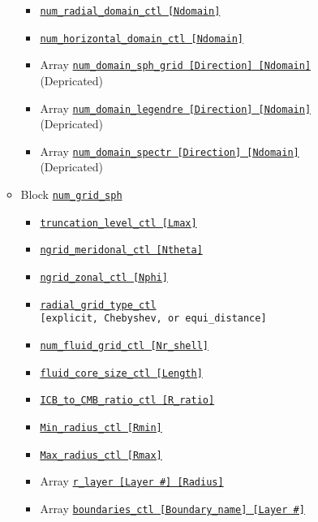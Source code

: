 \begin{itemize}
\begin{itemize}
\begin{itemize}
			\item \hyperref[href_t:num_radial_domain_ctl]{\tt num\_radial\_domain\_ctl [Ndomain]}
			\item \hyperref[href_t:num_horizontal_domain_ctl]{\tt num\_horizontal\_domain\_ctl [Ndomain]}
%
            		\item {\color{magenta} Array \hyperref[href_t:num_domain_sph_grid]
				{\tt num\_domain\_sph\_grid    [Direction]    [Ndomain]} \\
				(Depricated)}
			\item {\color{magenta} Array \hyperref[href_t:num_domain_legendre]
				{\tt num\_domain\_legendre    [Direction]    [Ndomain]} \\
				(Depricated)}
			\item {\color{magenta} Array \hyperref[href_t:num_domain_spectr]
				{\tt num\_domain\_spectr      [Direction]    [Ndomain]} \\
				(Depricated)}
			\end{itemize}
%
		\item Block \hyperref[href_t:num_grid_sph]{\tt num\_grid\_sph}
			\begin{itemize} \label{href_i:num_grid_sph}
	        \item \hyperref[href_t:truncation_level_ctl]{\tt truncation\_level\_ctl	[Lmax]}
			\item \hyperref[href_t:ngrid_meridonal_ctl]{\tt ngrid\_meridonal\_ctl [Ntheta]}
			\item \hyperref[href_t:ngrid_zonal_ctl]{\tt ngrid\_zonal\_ctl [Nphi]}
%
			\item \hyperref[href_t:radial_grid_type_ctl]{\tt radial\_grid\_type\_ctl} \\
				\verb|[explicit, Chebyshev, or equi_distance]| \label{href_i:radial_grid_type_ctl}
%
			\item \hyperref[href_t:num_fluid_grid_ctl]{\tt num\_fluid\_grid\_ctl  [Nr\_shell]}
			\item \hyperref[href_t:fluid_core_size_ctl]{\tt fluid\_core\_size\_ctl  [Length]}
			\item \hyperref[href_t:ICB_to_CMB_ratio_ctl]{\tt ICB\_to\_CMB\_ratio\_ctl  [R\_ratio]}
			\item \hyperref[href_t:Min_radius_ctl]{\tt Min\_radius\_ctl  [Rmin]}    
				\label{href_i:Min_radius_ctl}
			\item \hyperref[href_t:Max_radius_ctl]{\tt Max\_radius\_ctl  [Rmax]}    
				\label{href_i:Max_radius_ctl}
%
\\
			\item Array \hyperref[href_t:r_layer]{\tt r\_layer  [Layer \#]  [Radius]}    
%
			\item Array \hyperref[href_t:boundaries_ctl]{\tt boundaries\_ctl  [Boundary\_name]  [Layer \#]}    
			\end{itemize}
		\end{itemize}
	\end{itemize}

